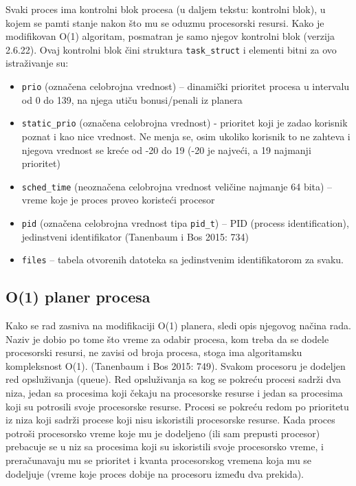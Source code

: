 Svaki proces ima kontrolni blok procesa (u daljem tekstu: kontrolni blok), u kojem se pamti stanje nakon što mu se oduzmu procesorski resursi. Kako je modifikovan O(1) algoritam, posmatran je samo njegov kontrolni blok (verzija 2.6.22).  Ovaj kontrolni blok čini struktura \texttt{task\_struct} i elementi bitni za ovo istraživanje su:

\begin{itemize}
    \item \texttt{prio} (označena celobrojna vrednost) -- dinamički prioritet procesa u intervalu od 0 do 139, na njega utiču bonusi/penali iz planera
    \item \texttt{static\_prio} (označena celobrojna vrednost) - prioritet koji je zadao korisnik poznat i kao nice vrednost. Ne menja se, osim ukoliko korisnik to ne zahteva i njegova vrednost se kreće od -20 do 19 (-20 je najveći, a 19 najmanji prioritet)
    \item \texttt{sched\_time} (neoznačena celobrojna vrednost veličine najmanje 64 bita) -- vreme koje je proces proveo koristeći procesor
    \item \texttt{pid} (označena celobrojna vrednost tipa \texttt{pid\_t}) -- PID (process identification), jedinstveni identifikator (Tanenbaum i Bos 2015: 734)
    \item \texttt{files} -- tabela otvorenih datoteka sa jedinstvenim identifikatorom za svaku.
\end{itemize}

\subsection{O(1) planer procesa}

Kako se rad zasniva na modifikaciji O(1) planera, sledi opis njegovog načina rada. Naziv je dobio po tome što vreme za odabir procesa, kom treba da se dodele procesorski resursi, ne zavisi od broja procesa, stoga ima algoritamsku kompleksnost O(1). (Tanenbaum i Bos 2015: 749). Svakom procesoru je dodeljen red opsluživanja (queue). Red opsluživanja sa kog se pokreću procesi sadrži dva niza, jedan sa procesima koji čekaju na procesorske resurse i jedan sa procesima koji su potrosili svoje procesorske resurse. Procesi se pokreću redom po prioritetu iz niza koji sadrži procese koji nisu iskoristili procesorske resurse. Kada proces potroši procesorsko vreme koje mu je dodeljeno (ili sam prepusti procesor) prebacuje se u niz sa procesima koji su iskoristili svoje procesorsko vreme, i preračunavaju mu se prioritet i kvanta procesorskog vremena koja mu se dodeljuje (vreme koje proces dobije na procesoru između dva prekida).

